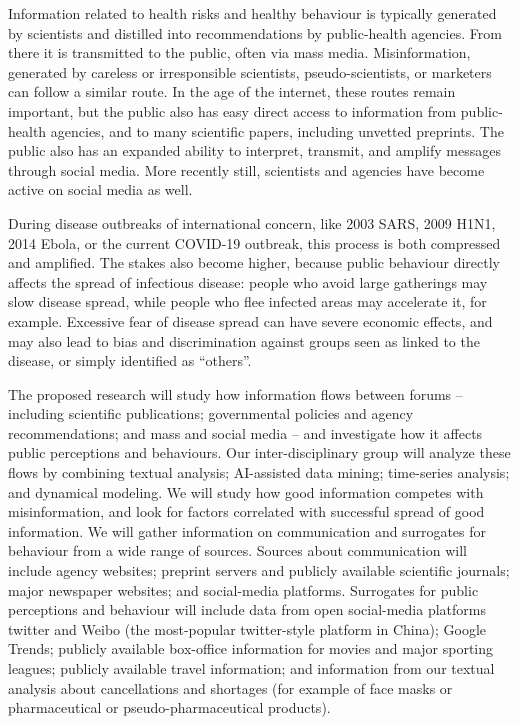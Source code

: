 


Information related to health risks and healthy behaviour is typically generated by scientists and distilled into recommendations by public-health agencies. From there it is transmitted to the public, often via mass media. Misinformation, generated by careless or irresponsible scientists, pseudo-scientists, or marketers can follow a similar route. In the age of the internet, these routes remain important, but the public also has easy direct access to information from public-health agencies, and to many scientific papers, including unvetted preprints. The public also has an expanded ability to interpret, transmit, and amplify messages through social media. More recently still, scientists and agencies have become active on social media as well.

During disease outbreaks of international concern, like 2003 SARS, 2009 H1N1, 2014 Ebola, or the current COVID-19 outbreak, this process is both compressed and amplified. The stakes also become higher, because public behaviour directly affects the spread of infectious disease: people who avoid large gatherings may slow disease spread, while people who flee infected areas may accelerate it, for example. Excessive fear of disease spread can have severe economic effects, and may also lead to bias and discrimination against groups seen as linked to the disease, or simply identified as ``others''. 

The proposed research will study how information flows between forums -- including scientific publications; governmental policies and agency recommendations; and mass and social media -- and investigate how it affects public perceptions and behaviours. 
Our inter-disciplinary group will analyze these flows by combining textual analysis; AI-assisted data mining; time-series analysis; and dynamical modeling. We will study how good information competes with misinformation, and look for factors correlated with successful spread of good information. 
We will gather information on communication and surrogates for behaviour from a wide range of sources. 
Sources about communication will include agency websites; preprint servers and publicly available scientific journals; major newspaper websites; and social-media platforms. 
Surrogates for public perceptions and behaviour will include data from open social-media platforms twitter and Weibo (the most-popular twitter-style platform in China); Google Trends; publicly available box-office information for movies and major sporting leagues; publicly available travel information; and information  from our textual analysis about cancellations and shortages (for example of face masks or pharmaceutical or pseudo-pharmaceutical products). 

